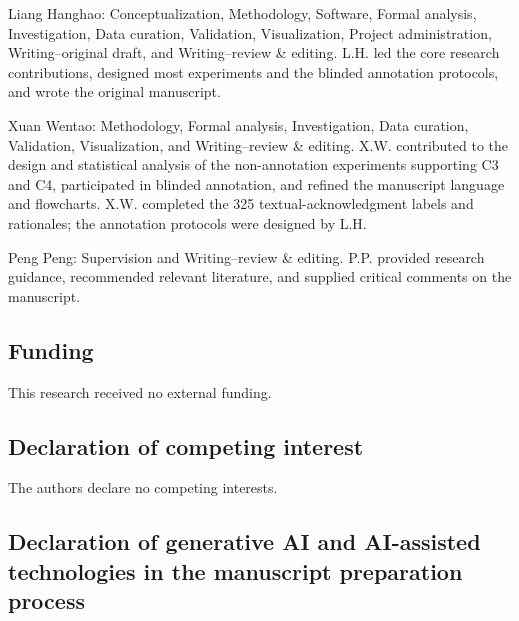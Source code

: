 Liang Hanghao: Conceptualization, Methodology, Software, Formal analysis, Investigation, Data curation, Validation, Visualization, Project administration, Writing--original draft, and Writing--review \& editing. L.H. led the core research contributions, designed most experiments and the blinded annotation protocols, and wrote the original manuscript.

Xuan Wentao: Methodology, Formal analysis, Investigation, Data curation, Validation, Visualization, and Writing--review \& editing. X.W. contributed to the design and statistical analysis of the non-annotation experiments supporting C3 and C4, participated in blinded annotation, and refined the manuscript language and flowcharts. X.W. completed the 325 textual-acknowledgment labels and rationales; the annotation protocols were designed by L.H.

Peng Peng: Supervision and Writing--review \& editing. P.P. provided research guidance, recommended relevant literature, and supplied critical comments on the manuscript.

\subsection*{Funding}

This research received no external funding.

\subsection*{Declaration of competing interest}

The authors declare no competing interests.

\subsection*{Declaration of generative AI and AI-assisted technologies in the manuscript preparation process}

